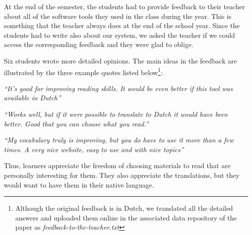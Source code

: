 

At the end of the semester, the students had to provide feedback to their teacher about all of the software tools they used in the class during the year. This is something that the teacher always does at the end of the school year. Since the students had to write also about our system, we asked the teacher if we could access the corresponding feedback and they were glad to oblige. 

Six students wrote more detailed opinions. The main ideas in the feedback are illustrated by the three example quotes listed below\footnote{Although the original feedback is in Dutch, we translated all the  detailed answers and uploaded them online in the associated data repository of the paper as {\em feedback-to-the-teacher.txt}}: 

\begin{description}
  \item {\em ``It's good for improving reading skills. It would be even better if this tool was available in Dutch''}
  \item {\em ``Works well, but if it were possible to translate to Dutch it would have been better. Good that you can choose what you read.''}
  \item {\em ``My vocabulary truly is improving, but you do have to use it more than a few times. A very nice website, easy to use and with nice topics''}
\end{description}


Thus, learners appreciate the freedom of choosing materials to read that are personally interesting for them. They also appreciate the translations, but they would want to have them in their native language. 



